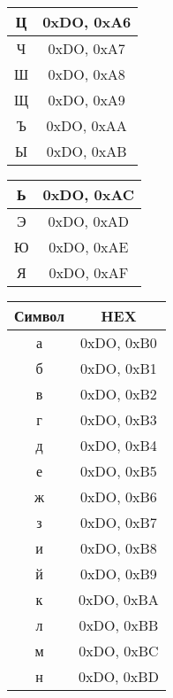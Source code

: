\documentclass[a4paper, 12pt, oneside]{article}
\begin{document}
{\begin{tabular}{|c|c|}
            \hline
            Ц      & 0xDO, 0xA6 \\
            \hline
            Ч      & 0xDO, 0xA7 \\
            \hline
            Ш      & 0xDO, 0xA8 \\
            \hline
            Щ      & 0xDO, 0xA9 \\
            \hline
            Ъ      & 0xDO, 0xAA \\
            \hline
            Ы      & 0xDO, 0xAB \\
            \hline
        \end{tabular}
        \begin{tabular}{|c|c|}
            \hline
            Ь & 0xDO, 0xAC \\
            \hline
            Э & 0xDO, 0xAD \\
            \hline
            Ю & 0xDO, 0xAE \\
            \hline
            Я & 0xDO, 0xAF \\
            \hline
        \end{tabular}
        \begin{tabular}{|c|c|}
            \hline
            Символ & HEX        \\
            \hline
            а      & 0xDO, 0xB0 \\
            \hline
            б      & 0xDO, 0xB1 \\
            \hline
            в      & 0xDO, 0xB2 \\
            \hline
            г      & 0xDO, 0xB3 \\
            \hline
            д      & 0xDO, 0xB4 \\
            \hline
            е      & 0xDO, 0xB5 \\
            \hline
            ж      & 0xDO, 0xB6 \\
            \hline
            з      & 0xDO, 0xB7 \\
            \hline
            и      & 0xDO, 0xB8 \\
            \hline
            й      & 0xDO, 0xB9 \\
            \hline
            к      & 0xDO, 0xBA \\
            \hline
            л      & 0xDO, 0xBB \\
            \hline
            м      & 0xDO, 0xBC \\
            \hline
            н      & 0xDO, 0xBD \\

\end{tabular}}
\end{document}
